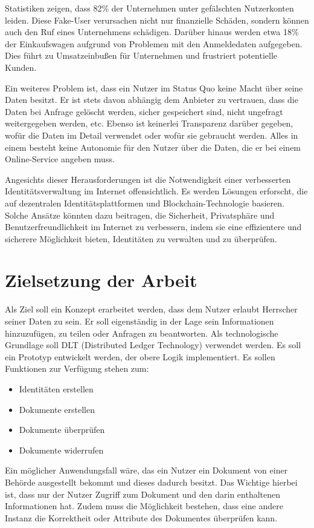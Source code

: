 Statistiken \cite{ID11} zeigen, dass 82\% der Unternehmen unter gefälschten Nutzerkonten leiden. Diese Fake-User verursachen nicht nur finanzielle Schäden, sondern können auch den Ruf eines Unternehmens schädigen. Darüber hinaus werden etwa 18\% der Einkaufswagen aufgrund von Problemen mit den Anmeldedaten aufgegeben. Dies führt zu Umsatzeinbußen für Unternehmen und frustriert potentielle Kunden.

Ein weiteres Problem ist, dass ein Nutzer im Status Quo keine Macht über seine Daten besitzt. Er ist stets davon abhängig dem Anbieter zu vertrauen, dass die Daten bei Anfrage gelöscht werden, sicher gespeichert sind, nicht ungefragt weitergegeben werden, etc. Ebenso ist keinerlei Transparenz darüber gegeben, wofür die Daten im Detail verwendet oder wofür sie gebraucht werden. Alles in einem besteht keine Autonomie für den Nutzer über die Daten, die er bei einem Online-Service angeben muss.

Angesichts dieser Herausforderungen ist die Notwendigkeit einer verbesserten Identitätsverwaltung im Internet offensichtlich. Es werden Lösungen erforscht, die auf dezentralen Identitätsplattformen und Blockchain-Technologie basieren. Solche Ansätze könnten dazu beitragen, die Sicherheit, Privatsphäre und Benutzerfreundlichkeit im Internet zu verbessern, indem sie eine effizientere und sicherere Möglichkeit bieten, Identitäten zu verwalten und zu überprüfen.

\section{Zielsetzung der Arbeit}
\label{zielsetzung}
Als Ziel soll ein Konzept erarbeitet werden, dass dem Nutzer erlaubt Herrscher seiner
Daten zu sein. Er soll eigenständig in der Lage sein Informationen hinzuzufügen, zu
teilen oder Anfragen zu beantworten. Als technologische Grundlage soll DLT (Distributed Ledger Technology) verwendet werden. Es soll ein Prototyp entwickelt werden, der obere Logik implementiert. Es sollen Funktionen zur Verfügung stehen zum:
\begin{itemize}
	\item Identitäten erstellen
	\item Dokumente erstellen
	\item Dokumente überprüfen
	\item Dokumente widerrufen
\end{itemize}
Ein möglicher Anwendungsfall wäre, das ein Nutzer ein Dokument von einer Behörde ausgestellt bekommt und dieses dadurch besitzt. Das Wichtige hierbei ist, dass nur der Nutzer Zugriff zum Dokument und den darin enthaltenen Informationen hat. Zudem muss die Möglichkeit bestehen, dass eine andere Instanz die Korrektheit oder Attribute des Dokumentes überprüfen kann.

